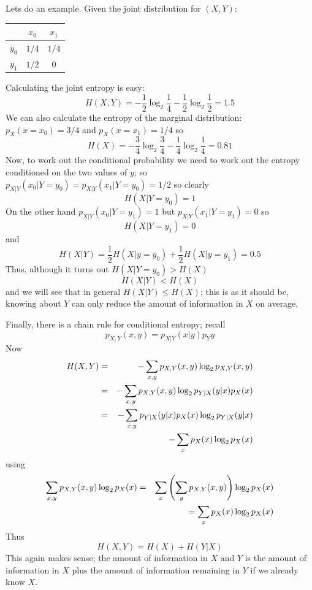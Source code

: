 \documentclass[12pt]{article}
\begin{document}
Lets do an example. Given the joint distribution for $(X,Y)$:
\begin{center}
\begin{tabular}{c|cc}
&$x_0$&$x_1$\\
\hline
$y_0$&$1/4$&$1/4$\\
$y_1$&$1/2$&$0$
\end{tabular}
\end{center}
Calculating the joint entropy is easy:
\begin{equation}
H(X,Y)=-\frac{1}{2}\log_2{\frac{1}{4}}-\frac{1}{2}\log_2{\frac{1}{2}}=1.5
\end{equation}
We can also calculate the entropy of the marginal distribution: $p_X(x=x_0)=3/4$ and $p_X(x=x_1)=1/4$ so
\begin{equation}
H(X)=-\frac{3}{4}\log_2{\frac{3}{4}}-\frac{1}{4}\log_2{\frac{1}{4}}=0.81
\end{equation}
Now, to work out the conditional probability we need to work out the
entropy conditioned on the two values of $y$; so
$p_{X|Y}(x_0|Y=y_0)=p_{X|Y}(x_1|Y=y_0)=1/2$ so clearly
\begin{equation}
H(X|Y=y_0)=1
\end{equation}
On the other hand $p_{X|Y}(x_0|Y=y_1)=1$ but $p_{X|Y}(x_1|Y=y_1)=0$ so
\begin{equation}
H(X|Y=y_1)=0
\end{equation}
and
\begin{equation}
H(X|Y)=\frac{1}{2}H(X|y=y_0)+\frac{1}{2}H(X|y=y_1)=0.5
\end{equation}
Thus, although it turns out $H(X|Y=y_0)>H(X)$
\begin{equation}
H(X|Y)<H(X)
\end{equation}
and we will see that in general $H(X|Y)\le H(X)$; this is as it should
be, knowing about $Y$ can only reduce the amount of information in $X$
on average.

Finally, there is a chain rule for conditional entropy; recall
\begin{equation}
p_{X,Y}(x,y)=p_{X|Y}(x|y)p_Y{y}
\end{equation}
Now
\begin{eqnarray}
H(X,Y)&=&-\sum_{x,y} p_{X,Y}(x,y)\log_2{p_{X,Y}(x,y)}\cr
&=&-\sum_{x,y} p_{X,Y}(x,y)\log_2{p_{Y|X}(y|x)p_X(x)}\cr
&=&-\sum_{x,y} p_{Y|X}(y|x)p_X(x)\log_2{p_{Y|X}(y|x)}\cr&&-\sum_x p_{X}(x)\log_2{p_X(x)}
\end{eqnarray}
using
\begin{eqnarray}
\sum_{x,y}p_{X,Y}(x,y)\log_2{p_X(x)}&=&\sum_{x}\left(\sum_y p_{X,Y}(x,y)\right)\log_2{p_X(x)}\cr &&=\sum_x p_{X}(x)\log_2{p_X(x)}
\end{eqnarray}
Thus
\begin{equation}
H(X,Y)=H(X)+H(Y|X)
\end{equation}
This again makes sense; the amount of information in $X$ and $Y$ is
the amount of information in $X$ plus the amount of information
remaining in $Y$ if we already know $X$.
\end{document}
